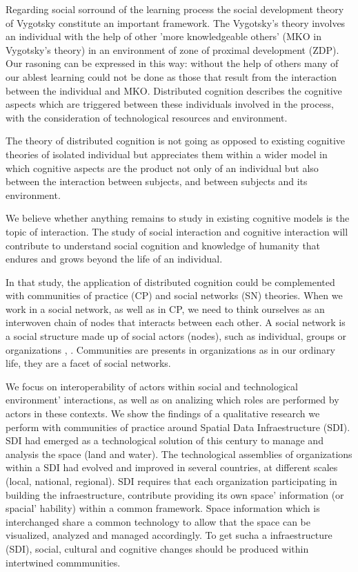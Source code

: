 \documentclass[10pt,twocolumn,ieeetran]{article}
\begin{document}
 
Regarding social sorround of the learning process the social development theory of Vygotsky \cite{Wertsch} 
constitute an important framework. The Vygotsky's theory involves an individual with the help of other 'more knowledgeable others' (MKO in Vygotsky's theory) in an environment of zone of proximal development (ZDP). Our rasoning can be expressed in this way: without the help of others many of our ablest learning could not be done as those that result from the interaction between the individual and MKO. Distributed cognition describes the cognitive aspects which are triggered between these individuals involved in the process, with the consideration of technological resources and environment.

The theory of distributed cognition \cite{Salomon} is not going as opposed to existing cognitive theories of isolated individual but appreciates them within a wider model in which cognitive aspects are the product not only of an individual but also between the interaction between subjects, and between subjects and its environment.

We believe whether anything remains to study in existing cognitive models is the topic of interaction. The study of social interaction and cognitive interaction will contribute to understand social cognition and knowledge of humanity \cite{Denny} that endures and grows beyond the life of an individual.

In that study, the application of distributed cognition could be complemented with communities of practice (CP) \cite{Wenger} and social networks (SN) \cite{Kadushin} \cite{Santos}\cite{Watts} theories. When we work in a social network, as well as in CP, we need to think ourselves as an interwoven chain of nodes that interacts between each other. A social network is a social structure made up of social actors (nodes), such as individual, groups or organizations \cite{Wasserman}, \cite{Jamali}. Communities are presents in organizations as in our ordinary life, they are a facet of social networks.

We focus on interoperability of actors within social and technological environment' interactions, as well as on analizing which roles are performed by actors in these contexts. We show the findings of a qualitative 
research we perform with communities of practice around Spatial Data Infraestructure (SDI). SDI had emerged
as a technological solution of this century to manage and analysis the space (land and water). The technological assemblies of organizations within a SDI had evolved and improved in several countries, at
different scales (local, national, regional). SDI requires that each organization participating in building the infraestructure, contribute providing its own space' information (or spacial' hability) within a common framework. Space information which is interchanged share a common technology to allow that the space can be visualized, analyzed and managed accordingly. To get sucha a infraestructure (SDI), social, cultural \cite{Nisbett} and cognitive changes should be produced within intertwined commmunities.
\end{document}

